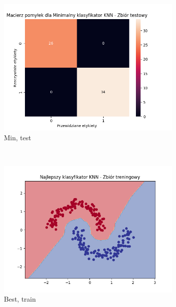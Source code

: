\documentclass[12pt]{article}
\newcommand*{\subfigwidth}{0.24\textwidth}
\begin{document}
\begin{figure}[H]
\begin{subfigure}[t]{\subfigwidth}
        \includegraphics[width=\linewidth]{img/exp_2/knn/2_2/min/test_matrix.png}
        \caption{Min, test}
    \end{subfigure} 
    \\
    \begin{subfigure}[t]{\subfigwidth}
        \includegraphics[width=\linewidth]{img/exp_2/knn/2_2/best/train_boundary.png}
        \caption{Best, train}
    \end{subfigure}
    \hfill
    \begin{subfigure}[t]{\subfigwidth}

\end{subfigure}
\end{figure}
\end{document}
